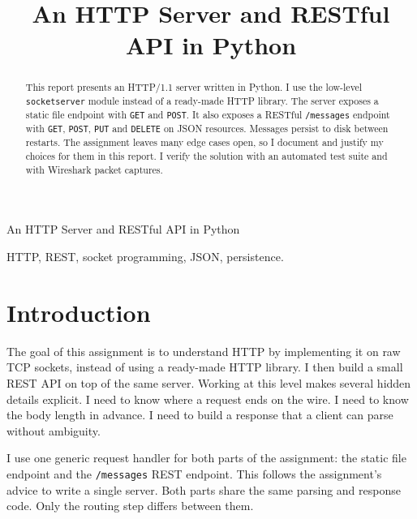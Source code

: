 \documentclass[conference]{IEEEtran}
\begin{document}
\title{An HTTP Server and RESTful API in Python}

\author{
}
%
{An HTTP Server and RESTful API in Python}


\maketitle

\begin{abstract}
	This report presents an HTTP/1.1 server written in Python. I use the
	low-level \texttt{socketserver} module instead of a ready-made HTTP
	library. The server exposes a static file endpoint with \texttt{GET} and
	\texttt{POST}. It also exposes a RESTful \texttt{/messages} endpoint with
	\texttt{GET}, \texttt{POST}, \texttt{PUT} and \texttt{DELETE} on JSON
	resources. Messages persist to disk between restarts. The assignment
	leaves many edge cases open, so I document and justify my choices for
	them in this report. I verify the solution with an automated test suite
	and with Wireshark packet captures.
\end{abstract}

\begin{IEEEkeywords}
	HTTP, REST, socket programming, JSON, persistence.
\end{IEEEkeywords}

\section{Introduction}
\label{Section:Introduction}
The goal of this assignment is to understand HTTP by implementing it on raw
TCP sockets, instead of using a ready-made HTTP library. I then build a
small REST API on top of the same server. Working at this level makes
several hidden details explicit. I need to know where a request ends on the
wire. I need to know the body length in advance. I need to build a response
that a client can parse without ambiguity.

I use one generic request handler for both parts of the assignment: the
static file endpoint and the \texttt{/messages} REST endpoint. This follows
the assignment's advice to write a single server. Both parts share the same
parsing and response code. Only the routing step differs between them.
\end{document}
